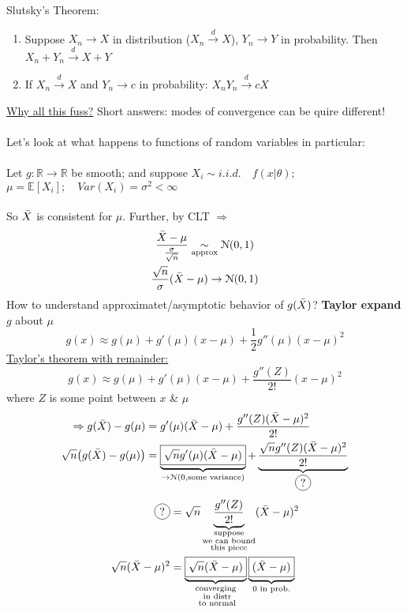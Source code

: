 \begin{theorem}
	Slutsky's Theorem: 
	\begin{enumerate}[label=\protect\circled{\arabic*}]
		\item Suppose $X_n \rightarrow X$ in distribution ($X_n \xrightarrow{d} X$), $Y_n \rightarrow Y$ in probability. Then $X_n + Y_n \xrightarrow{d} X + Y$
		\item If $X_n \xrightarrow{d} X$ and $Y_n \rightarrow c$ in probability: $X_n Y_n \xrightarrow{d} cX$
	\end{enumerate}
\end{theorem}
\underline{Why all this fuss?} Short answers: modes of convergence can be quire different!\\\\
Let's look at what happens to functions of random variables in particular:\\\\
Let $g: \mathbb{R} \rightarrow \mathbb{R}$ be smooth; and suppose $X_i \sim i.i.d. \quad f(x|\theta);$ \qquad $\mu = \mathbb{E}[X_i]; \quad Var(X_i) = \sigma^2 < \infty$\\\\
So $\bar{X}$ is consistent for $\mu$. Further, by CLT $\Rightarrow$
\begin{gather*}
	\frac{\bar{X} - \mu}{\frac{\sigma}{\sqrt{n}}} \underset{\text{approx}}{\sim} \mathcal{N}(0,1)\\
	\frac{\sqrt{n}}{\sigma} (\bar{X} - \mu) \rightarrow \mathcal{N}(0,1)
\end{gather*}
How to understand approximatet/asymptotic behavior of $g(\bar{X})$? \textbf{Taylor expand} $g$ about $\mu$
\begin{equation*}
	g(x) \approx g(\mu) + g'(\mu) (x - \mu) + \frac{1}{2} g''(\mu) (x-\mu)^2
\end{equation*}
\underline{Taylor's theorem with remainder:}
\begin{equation*}
	g(x) \approx g(\mu) + g'(\mu) (x - \mu) + \frac{g''(Z)}{2!} (x-\mu)^2
\end{equation*}
where $Z$ is some point between $x$ \& $\mu$ 
\begin{align*}
	\Rightarrow g(\bX) - g(\mu) & = g'(\mu) (\bX - \mu) + \frac{g''(Z) (\bX -\mu)^2}{2!} \\
	\sqrt{n} \big( g(\bX) - g(\mu) \big) & = \underbrace{\boxed{\sqrt{n} g'(\mu) (\bX - \mu)}}_{\rightarrow \mathcal{N}(0, \text{some variance})} + \underbrace{\frac{\sqrt{n} g''(Z) (\bX -\mu)^2}{2!}}_{\circled{?}}
\end{align*}
\begin{align*}
	\circled{?} & = \sqrt{n} \underbrace{\frac{g''(Z)}{2!}}_{\substack{\text{suppose} \\ \text{we can bound} \\ \text{this piece}}} (\bX - \mu)^2\\
	\sqrt{n} (\bX - \mu)^2 & = \underbrace{\boxed{\sqrt{n}(\bX - \mu)}}_{\substack{\text{converging} \\ \text{ in distr} \\ \text{ to normal}}} \underbrace{\boxed{(\bX - \mu)}}_{\text{0 in prob.}}
\end{align*}
